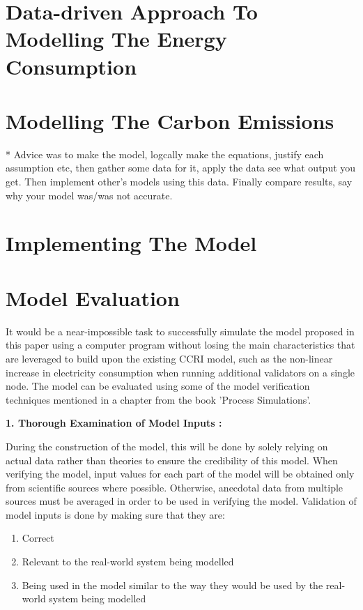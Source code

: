 \section {Data-driven Approach To Modelling The Energy Consumption}

\section {Modelling The Carbon Emissions }
* Advice was to make the model, logcally make the equations, justify each assumption etc, then gather some data for it, apply the data see what output you get. Then implement other's models using this data. Finally compare results, say why your model was/was not accurate.

\section {Implementing The Model}

\section {Model Evaluation}
\label{ModelEvalMEthodology}
 It would be a near-impossible task to successfully simulate the model proposed in this paper using a computer program without losing the main characteristics that are leveraged to build upon the existing CCRI model, such as the non-linear increase in electricity consumption when running additional validators on a single node. The model can be evaluated using some of the model verification techniques mentioned in a chapter \cite{Al-Aomar2015ModelTechniques} from the book 'Process Simulations'.

\textbf{1. Thorough Examination of Model Inputs :}

During the construction of the model, this will be done by solely relying on actual data rather than theories to ensure the credibility of this model. When verifying the model, input values for each part of the model will be obtained only from scientific sources where possible. Otherwise, anecdotal data from multiple sources must be averaged in order to be used in verifying the model. Validation of model inputs is done by making sure that they are:
\begin{enumerate}
    \item Correct
    \item Relevant to the real-world system being modelled
    \item Being used in the model similar to the way they would be used by the real-world system being modelled
\end{enumerate}  


